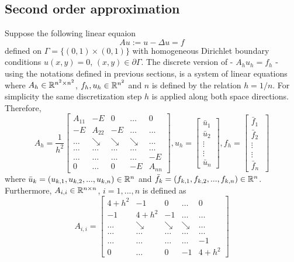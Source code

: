 \documentclass[11pt,a4paper,twoside]{article}
\begin{document}
\subsection{Second order approximation}
Suppose the following linear equaion
\begin{equation}\label{FPeq}
Au:=u-\Delta u = f
\end{equation}
defined on $\Gamma = \{ (0,1) \times (0,1) \}$ with homogeneous Dirichlet boundary conditions $u(x,y) = 0$, $(x,y) \in \partial \Gamma$. The discrete version of  - $A_h u_h = f_h$ - using the notations defined in previous sections, is a system of linear equations where $A_h \in \mathbb{R}^{n^2 \times n^2}$, $f_h, u_h \in \mathbb{R}^{n^2}$ and $n$ is defined by the relation $h=1/n$. For simplicity the same discretization step $h$ is applied along both space directions. Therefore,
\[
A_h = \frac{1}{h^2}
\begin{bmatrix}
    A_{11}       & -E          &  0              & \dots & 0 \\
    -E               & A_{22}  & -E              & \dots & \dots  \\
      \dots         & \searrow     & \searrow  & \searrow  & \dots  \\
      \dots         & \dots     & \dots         & \dots   &    \dots  \\
      \dots         & \dots    & \dots         & \dots & -E  \\
     0                 & \dots   &  0               & -E    & A_{nn}
\end{bmatrix}
,
u_h = 
\begin{bmatrix}
    \bar u_{1} \\
    \bar u_{2}  \\
    \vdots  \\
    \vdots  \\
    \bar u_{n}
\end{bmatrix}
,
f_h = 
\begin{bmatrix}
    \bar f_{1} \\
    \bar f_{2}  \\
    \vdots  \\
    \vdots  \\
    \bar f_{n}\
\end{bmatrix}
\]
where $\bar u_k = (u_{k,1}, u_{k,2}, ..., u_{k,n})\in \mathbb{R}^{n}$ and $\bar f_k = (f_{k,1}, f_{k,2}, ..., f_{k,n})\in \mathbb{R}^{n}$. Furthermore, $A_{i,i} \in \mathbb{R}^{n \times n}$, $i = 1, ..., n$ is defined as
\[
A_{i,i} = 
\begin{bmatrix}
    4+h^2       & -1          &  0              & \dots & 0 \\
    -1               & 4+h^2  & -1              & \dots & \dots  \\
      \dots         & \searrow     & \searrow  & \searrow  & \dots  \\
      \dots         & \dots     & \dots         & \dots   &    \dots  \\
      \dots         & \dots    & \dots         & \dots & -1  \\
     0                 & \dots   &  0               & -1    & 4+h^2
\end{bmatrix}
\]
\end{document}
